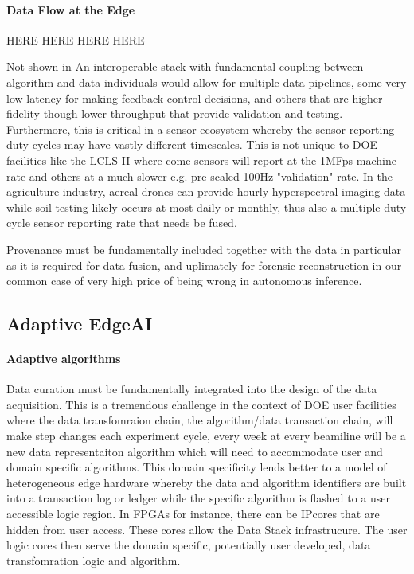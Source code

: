 \documentclass{article}
\begin{document}




\paragraph{Data Flow at the Edge}
HERE HERE HERE HERE

Not shown in 
An interoperable stack with fundamental coupling between algorithm and data individuals would allow for multiple data pipelines, some very low latency for making feedback control decisions, and others that are higher fidelity though lower throughput that provide validation and testing.  Furthermore, this is critical in a sensor ecosystem whereby the sensor reporting duty cycles may have vastly different timescales. 
This is not unique to DOE facilities like the LCLS-II where come sensors will report at the 1MFps machine rate and others at a much slower e.g. pre-scaled 100Hz "validation" rate.  
In the agriculture industry, aereal drones can provide hourly hyperspectral imaging data while soil testing likely occurs at most daily or monthly, thus also a multiple duty cycle sensor reporting rate that needs be fused.

Provenance must be fundamentally included together with the data in particular as it is required for data fusion, and uplimately for forensic reconstruction in our common case of very high price of being wrong in autonomous inference.




\subsection{Adaptive EdgeAI}
\paragraph{Adaptive algorithms}
Data curation must be fundamentally integrated into the design of the data acquisition.  This is a tremendous challenge in the context of DOE user facilities where the data transfomraion chain, the algorithm/data transaction chain, will make step changes each experiment cycle, every week at every beamiline will be a new data representaiton algorithm which will need to accommodate user and domain specific algorithms.
This domain specificity lends better to a model of heterogeneous edge hardware whereby the data and algorithm identifiers are built into a transaction log or ledger while the specific algorithm is flashed to a user accessible logic region.
In FPGAs for instance, there can be IPcores that are hidden from user access.  These cores allow the Data Stack infrastrucure.  The user logic cores then serve the domain specific, potentially user developed, data transfomration logic and algorithm.
\end{document}
